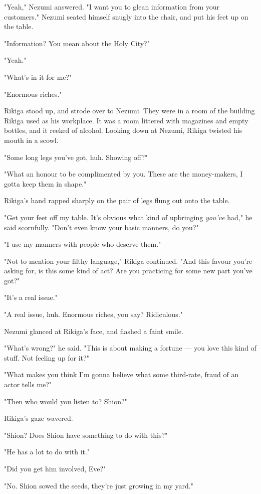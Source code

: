 "Yeah," Nezumi answered. "I want you to glean information from your
customers." Nezumi seated himself snugly into the chair, and put his
feet up on the table.

"Information? You mean about the Holy City?"

"Yeah."

"What's in it for me?"

"Enormous riches."

Rikiga stood up, and strode over to Nezumi. They were in a room of the
building Rikiga used as his workplace. It was a room littered with
magazines and empty bottles, and it reeked of alcohol. Looking down at
Nezumi, Rikiga twisted his mouth in a scowl.

"Some long legs you've got, huh. Showing off?"

"What an honour to be complimented by you. These are the money-makers, I
gotta keep them in shape."

Rikiga's hand rapped sharply on the pair of legs flung out onto the
table.

"Get your feet off my table. It's obvious what kind of upbringing \emph{you've}
had," he said scornfully. "Don't even know your basic manners, do you?"

"I use my manners with people who deserve them."

"Not to mention your filthy language," Rikiga continued. "And this
favour you're asking for, is this some kind of act? Are you practicing
for some new part you've got?"

"It's a real issue."

"A real issue, huh. Enormous riches, you say? Ridiculous."

Nezumi glanced at Rikiga's face, and flashed a faint smile.

"What's wrong?" he said. "This is about making a fortune --- you love this
kind of stuff. Not feeling up for it?"

"What makes you think I'm gonna believe what some third-rate, fraud of
an actor tells me?"

"Then who would you listen to? Shion?"

Rikiga's gaze wavered.

"Shion? Does Shion have something to do with this?"

"He has a lot to do with it."

"Did you get him involved, Eve?"

"No. Shion sowed the seeds, they're just growing in my yard."

